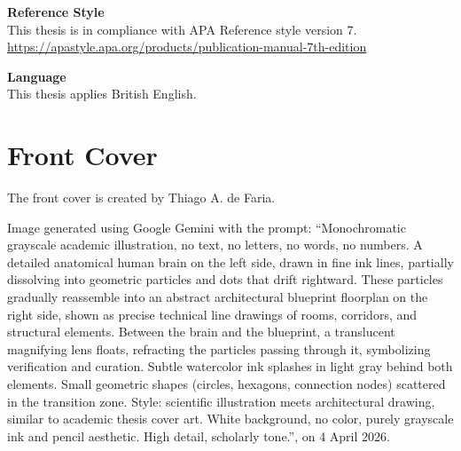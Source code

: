 {\vspace{0.2cm}

\noindent\hspace{0.2cm}\textbf{Reference Style}\\
\noindent\hspace{0.2cm}This thesis is in compliance with APA Reference style version 7.\\
\noindent\hspace{0.2cm}\url{https://apastyle.apa.org/products/publication-manual-7th-edition}

\vspace{0.2cm}

\noindent\hspace{0.2cm}\textbf{Language}\\
\noindent\hspace{0.2cm}This thesis applies British English.

}

\clearpage

\thispagestyle{empty}
\section*{Front Cover}

{\footnotesize
\noindent The front cover is created by Thiago A. de Faria.

\vspace{0.3cm}

\noindent Image generated using Google Gemini with the prompt: ``Monochromatic grayscale academic illustration, no text, no letters, no words, no numbers. A detailed anatomical human brain on the left side, drawn in fine ink lines, partially dissolving into geometric particles and dots that drift rightward. These particles gradually reassemble into an abstract architectural blueprint floorplan on the right side, shown as precise technical line drawings of rooms, corridors, and structural elements. Between the brain and the blueprint, a translucent magnifying lens floats, refracting the particles passing through it, symbolizing verification and curation. Subtle watercolor ink splashes in light gray behind both elements. Small geometric shapes (circles, hexagons, connection nodes) scattered in the transition zone. Style: scientific illustration meets architectural drawing, similar to academic thesis cover art. White background, no color, purely grayscale ink and pencil aesthetic. High detail, scholarly tone.'', on 4 April 2026.
}


